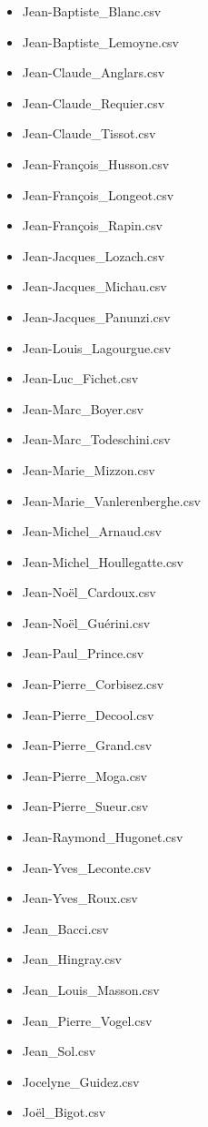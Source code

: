 \documentclass[a4paper,12pt,twoside]{book}
\begin{document}
\begin{itemize}
  \item Jean-Baptiste\_Blanc.csv
  \item Jean-Baptiste\_Lemoyne.csv
  \item Jean-Claude\_Anglars.csv
  \item Jean-Claude\_Requier.csv
  \item Jean-Claude\_Tissot.csv
  \item Jean-François\_Husson.csv
  \item Jean-François\_Longeot.csv
  \item Jean-François\_Rapin.csv
  \item Jean-Jacques\_Lozach.csv
  \item Jean-Jacques\_Michau.csv
  \item Jean-Jacques\_Panunzi.csv
  \item Jean-Louis\_Lagourgue.csv
  \item Jean-Luc\_Fichet.csv
  \item Jean-Marc\_Boyer.csv
  \item Jean-Marc\_Todeschini.csv
  \item Jean-Marie\_Mizzon.csv
  \item Jean-Marie\_Vanlerenberghe.csv
  \item Jean-Michel\_Arnaud.csv
  \item Jean-Michel\_Houllegatte.csv
  \item Jean-Noël\_Cardoux.csv
  \item Jean-Noël\_Guérini.csv
  \item Jean-Paul\_Prince.csv
  \item Jean-Pierre\_Corbisez.csv
  \item Jean-Pierre\_Decool.csv
  \item Jean-Pierre\_Grand.csv
  \item Jean-Pierre\_Moga.csv
  \item Jean-Pierre\_Sueur.csv
  \item Jean-Raymond\_Hugonet.csv
  \item Jean-Yves\_Leconte.csv
  \item Jean-Yves\_Roux.csv
  \item Jean\_Bacci.csv
  \item Jean\_Hingray.csv
  \item Jean\_Louis\_Masson.csv
  \item Jean\_Pierre\_Vogel.csv
  \item Jean\_Sol.csv
  \item Jocelyne\_Guidez.csv
  \item Joël\_Bigot.csv

\end{itemize}
\end{document}
